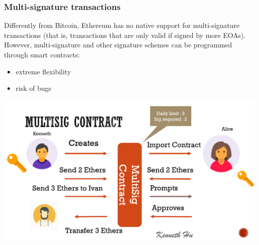 \documentclass[11pt]{beamer}  %
\begin{document}
\begin{frame}\frametitle{Multi-signature transactions}

  \begin{greenbox}{}
    Differently from Bitcoin, Ethereum has no native support for multi-signature transactions
    (that is, transactions that are only valid if signed by more EOAs). However,
    multi-signature and other signature schemes can be programmed through smart contracts:

    \begin{itemize}
    \item extreme flexibility
    \item risk of bugs
    \end{itemize}
      
  \end{greenbox}

  \bigskip

  \begin{center}
    \includegraphics[scale=0.15,clip=false]{pictures/multi-signature.png}
  \end{center}

\end{frame}
\end{document}
